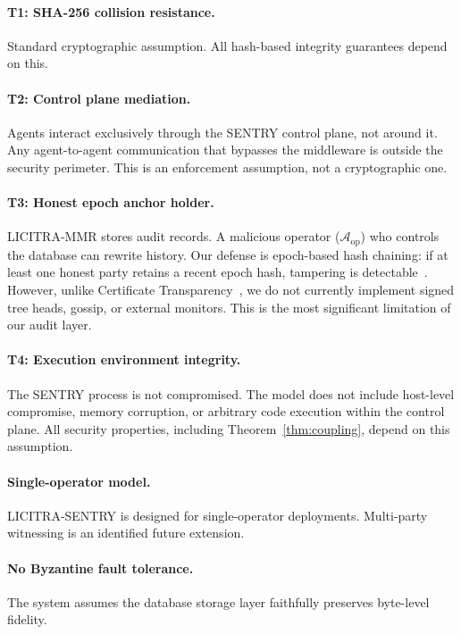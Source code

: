 \documentclass[11pt,a4paper]{article}
\begin{document}
\paragraph{T1: SHA-256 collision resistance.}
Standard cryptographic assumption. All hash-based integrity guarantees depend on this.

\paragraph{T2: Control plane mediation.}
Agents interact exclusively through the SENTRY control plane, not around it. Any agent-to-agent
communication that bypasses the middleware is outside the security perimeter. This is an
enforcement assumption, not a cryptographic one.

\paragraph{T3: Honest epoch anchor holder.}
LICITRA-MMR stores audit records. A malicious operator ($\mathcal{A}_{\mathrm{op}}$) who
controls the database can rewrite history. Our defense is epoch-based hash chaining: if at least
one honest party retains a recent epoch hash, tampering is
detectable~\cite[Theorem~1]{licitrammr}. However, unlike Certificate
Transparency~\cite{ct}, we do not currently implement signed tree heads, gossip, or external
monitors. This is the most significant limitation of our audit layer.

\paragraph{T4: Execution environment integrity.}
The SENTRY process is not compromised. The model does not include host-level compromise, memory
corruption, or arbitrary code execution within the control plane. All security properties,
including Theorem~\ref{thm:coupling}, depend on this assumption.

\paragraph{Single-operator model.}
LICITRA-SENTRY is designed for single-operator deployments. Multi-party witnessing is an
identified future extension.

\paragraph{No Byzantine fault tolerance.}
The system assumes the database storage layer faithfully preserves byte-level fidelity.
\end{document}
